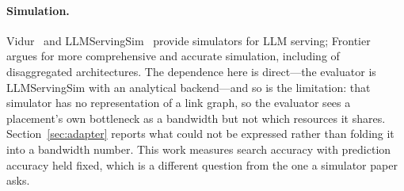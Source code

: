 \paragraph{Simulation.}
Vidur~\cite{vidur} and LLMServingSim~\cite{llmservingsim,llmservingsim2}
provide simulators for LLM serving; Frontier~\cite{frontier,frontier2} argues
for more comprehensive and accurate simulation, including of disaggregated
architectures. The dependence here is direct---the evaluator is LLMServingSim
with an analytical backend---and so is the limitation: that simulator has no
representation of a link graph, so the evaluator sees a placement's own
bottleneck as a bandwidth but not which resources it shares.
Section~\ref{sec:adapter} reports what could not be expressed rather than
folding it into a bandwidth number.
This work measures search accuracy with prediction accuracy held fixed, which
is a different question from the one a simulator paper asks.

